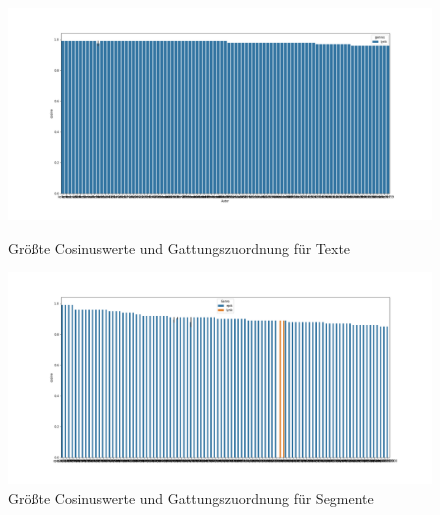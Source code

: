 \documentclass[a4paper,10p]{article}
\begin{document}
\begin{figure}{}
	\centering
	\begin{minipage}[b]{.45\linewidth}
		\centering
		\includegraphics[width=\linewidth]{autoren_100cos_gattung.png}
		\caption{Größte Cosinuswerte und Gattungszuordnung für Texte}
	\end{minipage}
	\hfill
	\begin{minipage}[b]{.45\linewidth}
		\centering
		\includegraphics[width=\linewidth]{autoren_segmente_100cos_gattung.png}
		\caption{Größte Cosinuswerte und Gattungszuordnung für Segmente} 

	\end{minipage}
		\label{autoren_100cos}
\end{figure}
\end{document}

